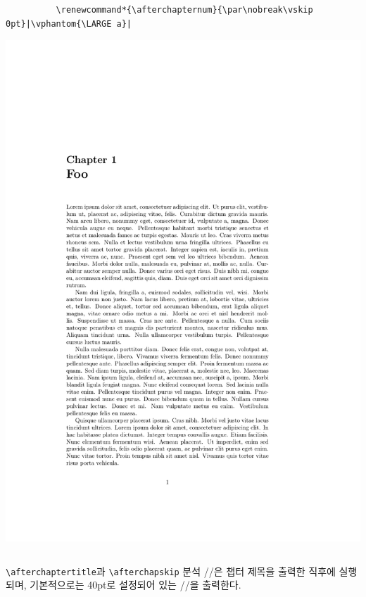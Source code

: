 \documentclass{beamer}
\def\tbs{\textbackslash}
\begin{document}
\begin{frame}[fragile]
\begin{overprint}
\begin{columns}
      \begin{column}{0.5\textwidth}
        \begin{verbatim}
          \renewcommand*{\afterchapternum}{\par\nobreak\vskip 0pt}|\vphantom{\LARGE a}|
        \end{verbatim}
        \begin{center}
          \includegraphics[frame,page=1,width=0.8\linewidth]{examples/afterchapternum-3}
        \end{center}
      \end{column}
    \end{columns}
  \end{overprint}
\end{frame}

\begin{frame}[fragile]
  {\texttt{\tbs afterchaptertitle}과 \texttt{\tbs afterchapskip} 분석}
  \ltxverb/\afterchaptertitle/은 챕터 제목을 출력한 직후에 실행되며,
  기본적으로는 40pt로 설정되어 있는 \ltxverb/\afterchapskip/을 출력한다.
\end{frame}
\end{document}
